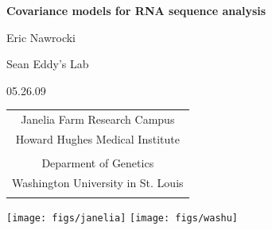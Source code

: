 \documentclass[landscape]{slides}
\begin{document}
\begin{slide}
\begin{center}
\large{\textbf{Covariance models for RNA sequence analysis}}
\normalsize

Eric Nawrocki

Sean Eddy's Lab

05.26.09

\medskip

\small

\begin{tabular}{c}
Janelia Farm Research Campus \\
Howard Hughes Medical Institute \\ 
\\
Deparment of Genetics \\
Washington University in St. Louis \\
\\
\end{tabular}

\texttt{[image: figs/janelia]}
\hspace{2in}
\texttt{[image: figs/washu]}


\end{center}
\end{slide}

\end{document}
